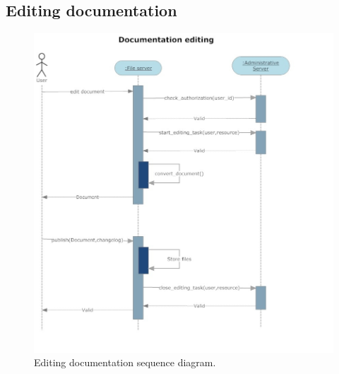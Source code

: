 \subsection{Editing documentation}
\begin{figure}
\begin{centering}
\includegraphics[scale=0.45]{assign3/sdraw/imgs/editing.jpg}
\caption{Editing documentation sequence diagram.}
\label{3img:[sequence]editing}
\end{centering}
\end{figure}
